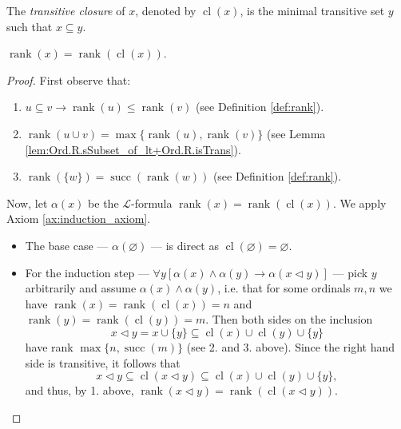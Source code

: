 \begin{definition}
    \label{def:cl}
    The \textit{transitive closure} of $x$, denoted by $\operatorname{cl}(x)$, is the minimal 
    transitive set $y$ such that $x \subseteq y$.
\end{definition}

\begin{theorem}
    \label{thm:rank_eq_rank_cl}
    $\operatorname{rank}(x) = \operatorname{rank}(\operatorname{cl}(x))$.
\end{theorem}

\begin{proof}
    First observe that:
    \begin{enumerate}
        \item $u \subseteq v \rightarrow \operatorname{rank}(u) \leq \operatorname{rank}(v)$ 
        (see Definition \ref{def:rank}).
        \item $\operatorname{rank}(u \cup v) = \max 
        \{\operatorname{rank}(u), \operatorname{rank}(v)\}$
        (see Lemma \ref{lem:Ord.R.sSubset_of_lt+Ord.R.isTrans}).
        \item $\operatorname{rank}(\{w\}) = \operatorname{succ}(\operatorname{rank}(w))$
        (see Definition \ref{def:rank}).
    \end{enumerate}
    Now, let $\alpha (x)$ be the $\mathcal{L}$-formula 
    $\operatorname{rank}(x) = \operatorname{rank}(\operatorname{cl}(x))$.
    We apply Axiom \ref{ax:induction_axiom}.
    \begin{itemize}
        \item The base case — $\alpha (\varnothing)$ — is direct as 
        $\operatorname{cl}(\varnothing) = \varnothing$.
        \item For the induction step 
        — $\forall y[\alpha(x) \land \alpha(y) \rightarrow \alpha(x \lhd y)]$ — 
        pick $y$ arbitrarily and assume $\alpha(x) \land \alpha(y)$, i.e. that for some
        ordinals $m,n$ we have 
        $\operatorname{rank}(x) = \operatorname{rank}(\operatorname{cl}(x)) = n$ and
        $\operatorname{rank}(y) = \operatorname{rank}(\operatorname{cl}(y)) = m$.
        Then both sides on the inclusion
        $$
        x \lhd y = x \cup \{y\} \subseteq \operatorname{cl}(x) \cup \operatorname{cl}(y) \cup \{y\}
        $$
        have rank $\max \{n,\operatorname{succ}(m)\}$ (see 2. and 3. above).
        Since the right hand side is transitive, it follows that
        $$
        x \lhd y \subseteq \operatorname{cl}(x \lhd y) \subseteq 
        \operatorname{cl}(x) \cup \operatorname{cl}(y) \cup \{y\},
        $$
        and thus, by 1. above, 
        $\operatorname{rank}(x \lhd y) = \operatorname{rank}(\operatorname{cl}(x \lhd y))$.
    \end{itemize}
\end{proof}

